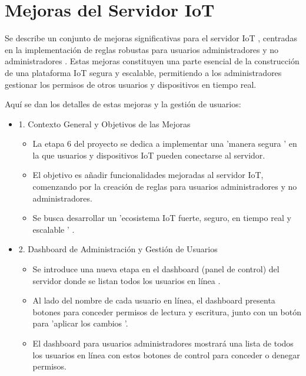 \documentclass{report}
\begin{document}
\section{Mejoras del Servidor IoT}
Se describe un conjunto de  mejoras significativas para el servidor IoT , centradas en la implementación de  reglas robustas para 
usuarios administradores y no administradores . Estas mejoras constituyen una parte esencial de la construcción de una plataforma IoT segura 
y escalable, permitiendo a los administradores gestionar los permisos de otros usuarios y dispositivos en tiempo real.

Aquí se dan los detalles de estas mejoras y la gestión de usuarios:
\begin{itemize}
    \item 1. Contexto General y Objetivos de las Mejoras
    \begin{itemize}
        \item La etapa 6 del proyecto se dedica a implementar una   'manera segura '  en la que usuarios y dispositivos IoT pueden conectarse 
        al servidor.
        \item El objetivo es  añadir funcionalidades mejoradas  al servidor IoT, comenzando por la creación de reglas para usuarios administradores 
        y no administradores.
        \item Se busca desarrollar un   'ecosistema IoT fuerte, seguro, en tiempo real y escalable ' .
    \end{itemize}

    \item 2. Dashboard de Administración y Gestión de Usuarios
    \begin{itemize}
        \item Se introduce una  nueva etapa en el dashboard  (panel de control) del servidor donde se listan todos los  usuarios en línea .
        \item Al lado del nombre de cada usuario en línea, el dashboard presenta  botones para conceder permisos de lectura y escritura, junto con 
        un botón para  'aplicar los cambios '.
        \item El dashboard para usuarios administradores mostrará una lista de todos los usuarios en línea con estos botones de control para 
        conceder o denegar permisos.
    \end{itemize}


\end{itemize}
\end{document}
